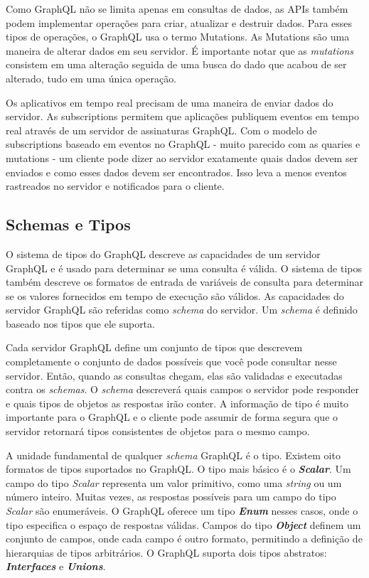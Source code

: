 Como GraphQL não se limita apenas em consultas de dados, as APIs também podem implementar operações para criar, atualizar e destruir dados. Para esses tipos de operações, o GraphQL usa o termo Mutations. As Mutations são uma maneira de alterar dados em seu servidor. É importante notar que as \textit{mutations} consistem em uma alteração seguida de uma busca do dado que acabou de ser alterado, tudo em uma única operação.

Os aplicativos em tempo real precisam de uma maneira de enviar dados do servidor. As subscriptions permitem que aplicações publiquem eventos em tempo real através de um servidor de assinaturas GraphQL.
Com o modelo de subscriptions baseado em eventos no GraphQL - muito parecido com as quaries e mutations - um cliente pode dizer ao servidor exatamente quais dados devem ser enviados e como esses dados devem ser encontrados. Isso leva a menos eventos rastreados no servidor e notificados para o cliente.

\subsection{Schemas e Tipos}


O sistema de tipos do GraphQL descreve as capacidades de um servidor GraphQL e é usado para determinar se uma consulta é válida. O sistema de tipos também descreve os formatos de entrada de variáveis de consulta para determinar se os valores fornecidos em tempo de execução são válidos. As capacidades do servidor GraphQL são referidas como \textit{schema} do servidor. Um \textit{schema} é definido baseado nos tipos que ele suporta.

Cada servidor GraphQL define um conjunto de tipos que descrevem completamente o conjunto de dados possíveis que você pode consultar nesse servidor. Então, quando as consultas chegam, elas são validadas e executadas contra os \textit{schemas}. O \textit{schema} descreverá quais campos o servidor pode responder e quais tipos de objetos as respostas irão conter. A informação de tipo é muito importante para o GraphQL e o cliente pode assumir de forma segura que o servidor retornará tipos consistentes de objetos para o mesmo campo.

A unidade fundamental de qualquer \textit{schema} GraphQL é o tipo. Existem oito formatos de tipos suportados no GraphQL. O tipo mais básico é o \textit{\textbf{Scalar}}. Um campo do tipo \textit{Scalar} representa um valor primitivo, como uma \textit{string} ou um número inteiro. Muitas vezes, as respostas possíveis para um campo  do tipo \textit{Scalar} são enumeráveis. O GraphQL oferece um tipo \textit{\textbf{Enum}} nesses casos, onde o tipo especifica o espaço de respostas válidas. Campos do tipo \textit{\textbf{Object}} definem um conjunto de campos, onde cada campo é outro formato, permitindo a definição de hierarquias de tipos arbitrários. O GraphQL suporta dois tipos abstratos:  \textit{\textbf{Interfaces}} e  \textit{\textbf{Unions}}.

